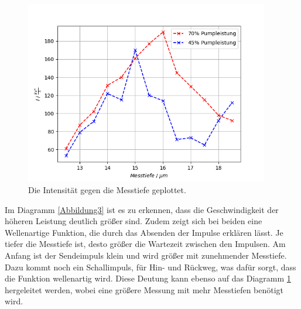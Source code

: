 \begin{figure}[H]
    \centering
    \includegraphics[height=80mm]{bilder/Plot4.png}
    \caption{Die Intensität gegen die Messtiefe geplottet.\label{Abbildung4} }
\end{figure}

\begin{flushleft}
    Im Diagramm \ref{Abbildung3} ist es zu erkennen, dass die Geschwindigkeit der höheren Leistung deutlich größer sind.
    Zudem zeigt sich bei beiden eine Wellenartige Funktion, die durch das Absenden der Impulse erklären lässt.
    Je tiefer die Messtiefe ist, desto größer die Wartezeit zwischen den Impulsen.
    Am Anfang ist der Sendeimpuls klein und wird größer mit zunehmender Messtiefe.
    Dazu kommt noch ein Schallimpuls, für Hin- und Rückweg, was dafür sorgt, dass die Funktion wellenartig wird.
    Diese Deutung kann ebenso auf das Diagramm \ref{Abbildung4} hergeleitet werden, wobei eine größere Messung mit mehr Messtiefen benötigt wird. 
\end{flushleft}